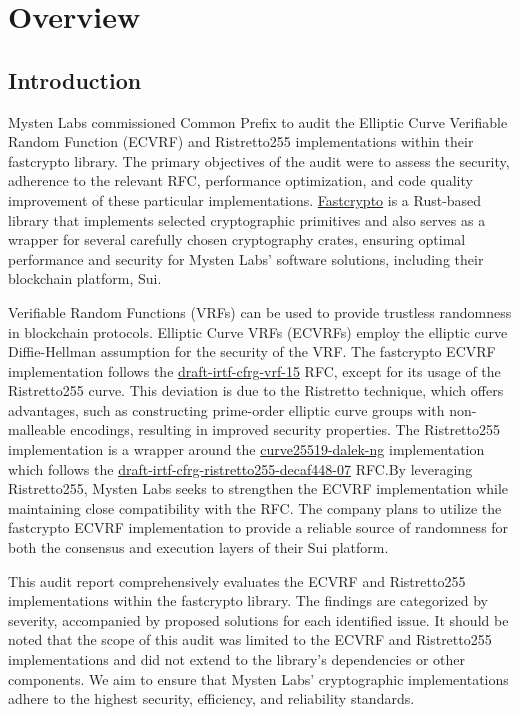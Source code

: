 \section{Overview}
\subsection{Introduction}
Mysten Labs commissioned Common Prefix to audit the Elliptic Curve Verifiable Random Function (ECVRF) and Ristretto255 implementations within their fastcrypto library. The primary objectives of the audit were to assess the security, adherence to the relevant RFC, performance optimization, and code quality improvement of these particular implementations. \href{https://github.com/MystenLabs/fastcrypto}{Fastcrypto} is a Rust-based library that implements selected cryptographic primitives and also serves as a wrapper for several carefully chosen cryptography crates, ensuring optimal performance and security for Mysten Labs' software solutions, including their blockchain platform, Sui.

Verifiable Random Functions (VRFs) can be used to provide trustless randomness in blockchain protocols\cite{praos,algorand}. Elliptic Curve VRFs (ECVRFs) employ the elliptic curve Diffie-Hellman assumption for the security of the VRF\cite{vrf}. The fastcrypto ECVRF implementation follows the \href{https://datatracker.ietf.org/doc/draft-irtf-cfrg-vrf/}{draft-irtf-cfrg-vrf-15} RFC\cite{vrf-rfc}, except for its usage of the Ristretto255 curve. This deviation is due to the Ristretto technique, which offers advantages, such as constructing prime-order elliptic
curve groups with non-malleable encodings, resulting in improved security properties\cite{ristretto255-rfc}. The Ristretto255 implementation is a wrapper around the \href{https://github.com/zkcrypto/curve25519-dalek-ng}{curve25519-dalek-ng} implementation which follows the \href{https://datatracker.ietf.org/doc/draft-irtf-cfrg-ristretto255-decaf448/}{draft-irtf-cfrg-ristretto255-decaf448-07} RFC\cite{ristretto255-rfc}.By leveraging Ristretto255, Mysten Labs seeks to strengthen the ECVRF implementation while maintaining close compatibility with the RFC. The company plans to utilize the fastcrypto ECVRF implementation to provide a reliable source of randomness for both the consensus and execution layers of their Sui platform.

This audit report comprehensively evaluates the ECVRF and Ristretto255 implementations within the fastcrypto library. The findings are categorized by severity, accompanied by proposed solutions for each identified issue. It should be noted that the scope of this audit was limited to the ECVRF and Ristretto255 implementations and did not extend to the library's dependencies or other components. We aim to ensure that Mysten Labs' cryptographic implementations adhere to the highest security, efficiency, and reliability standards.

